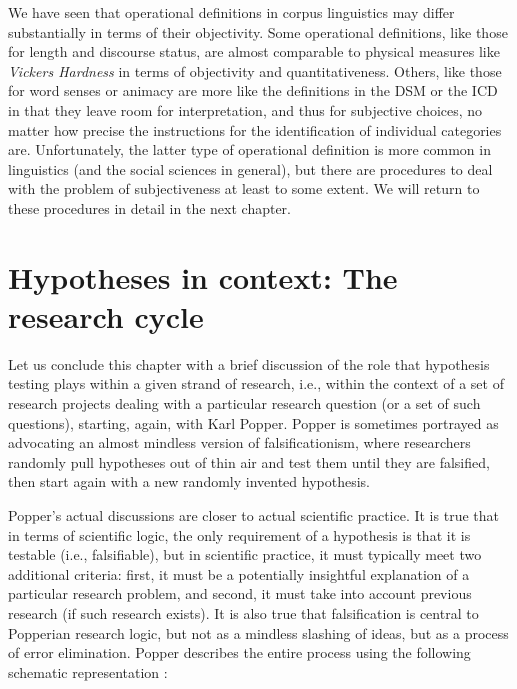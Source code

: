 We have seen that operational  definitions in corpus linguistics may differ substantially in terms of their objectivity. Some operational definitions, like those for length  and discourse status, are almost comparable to physical measures  like \textit{Vickers Hardness} in terms of objectivity and quantitativeness. Others, like those for word senses or animacy  are more like the definitions in the DSM or the ICD in that they leave room for interpretation, and thus for subjective choices, no matter how precise the instructions for the identification of individual categories  are. Unfortunately, the latter type of operational  definition is more common in linguistics (and the social sciences in general), but there are procedures to deal with the problem of subjectiveness at least to some extent. We will return to these procedures in detail in the next chapter.

\section{Hypotheses in context: The research cycle}
\label{sec:researchcycle}

Let us conclude this chapter with a brief discussion of the role that hypothesis  testing plays within a given strand of research, i.e., within the context of a set of research projects dealing with a particular research question (or a set of such questions), starting, again, with Karl Popper. Popper is sometimes portrayed as advocating an almost mindless version of falsificationism,  where researchers randomly pull hypotheses out of thin air and test them until they are falsified, then start again with a new randomly invented hypothesis.

Popper's actual discussions are closer to actual scientific practice. It is true that in terms of scientific logic, the only requirement of a hypothesis  is that it is testable (i.e., falsifiable),  but in scientific practice, it must typically meet two additional criteria: first, it must be a potentially insightful explanation  of a particular research problem, and second, it must take into account previous research (if such research exists). It is also true that falsification is central to Popperian research logic, but not as a mindless slashing of ideas, but as a process of error elimination. Popper describes the entire process using the following schematic representation \citep[3]{yourgrau_realist_1970}:

